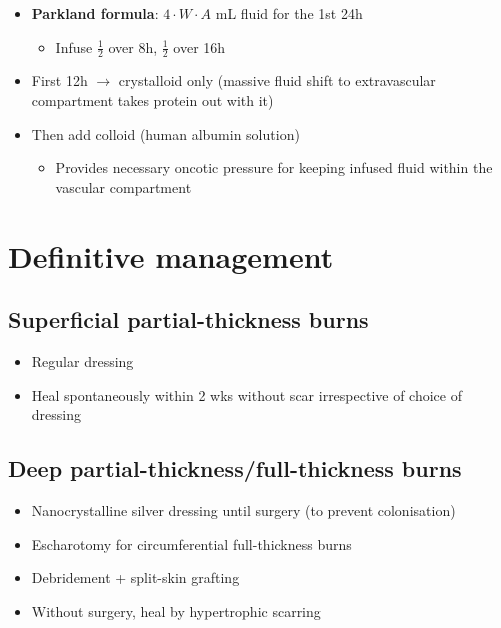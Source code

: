 \documentclass[
  14pt,
]{memoir}
\providecommand{\tightlist}{%
  \setlength{\itemsep}{0pt}\setlength{\parskip}{0pt}}
\begin{document}
\begin{itemize}
\tightlist
\item
  \textbf{Parkland formula}: \(4\cdot W \cdot A\) mL fluid for the 1st
  24h

  \begin{itemize}
  \tightlist
  \item
    Infuse \(\frac{1}{2}\) over 8h, \(\frac{1}{2}\) over 16h
  \end{itemize}
\item
  First 12h \(\rightarrow\) crystalloid only (massive fluid shift to
  extravascular compartment takes protein out with it)
\item
  Then add colloid (human albumin solution)

  \begin{itemize}
  \tightlist
  \item
    Provides necessary oncotic pressure for keeping infused fluid within
    the vascular compartment
  \end{itemize}
\end{itemize}

\hypertarget{definitive-management}{%
\section{Definitive management}\label{definitive-management}}

\hypertarget{superficial-partial-thickness-burns}{%
\subsection{Superficial partial-thickness
burns}\label{superficial-partial-thickness-burns}}

\begin{itemize}
\tightlist
\item
  Regular dressing
\item
  Heal spontaneously within 2 wks without scar irrespective of choice of
  dressing
\end{itemize}

\hypertarget{deep-partial-thicknessfull-thickness-burns}{%
\subsection{Deep partial-thickness/full-thickness
burns}\label{deep-partial-thicknessfull-thickness-burns}}

\begin{itemize}
\tightlist
\item
  Nanocrystalline silver dressing until surgery (to prevent
  colonisation)
\item
  Escharotomy for circumferential full-thickness burns
\item
  Debridement + split-skin grafting
\item
  Without surgery, heal by hypertrophic scarring
\end{itemize}
\end{document}
